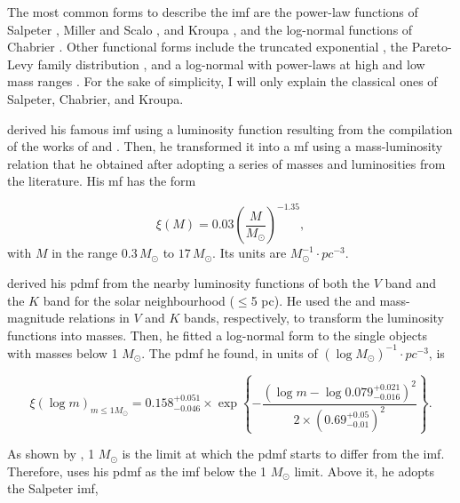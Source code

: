 The most common forms to describe the \gls{imf} are the power-law functions of Salpeter \citep{Salpeter1955}, Miller and Scalo \citep{1979ApJS...41..513M}, and Kroupa \citep{2001MNRAS.322..231K,2002Sci...295...82K,2013pss5.book..115K,Thies2007,2008MNRAS.390.1200T}, and the log-normal functions of Chabrier \citep{Chabrier2003a,Chabrier2003b,Chabrier2005}. Other functional forms include the truncated exponential \citep{2001AGM....18S0551D}, the Pareto-Levy family distribution \citep{2012MNRAS.423.1018C}, and a log-normal with power-laws at high and low mass ranges \citep{2013MNRAS.429.1725M}. For the sake of simplicity, I will only explain the classical ones of Salpeter, Chabrier, and Kroupa.

\citet{Salpeter1955} derived his famous \gls{imf} using a luminosity function resulting from the compilation of the works of \citet{1939POMin...7....1L,1941NYASA..42..201L} and \citet{1925PGro...38D...1V,1936PGro...47....1V}. Then, he transformed it into a \gls{mf} using a mass-luminosity relation that he obtained after adopting a series of masses and luminosities from the literature. His \gls{mf} has the form

\begin{equation}
\xi(M)=0.03 \left(\frac{M}{M_{\odot}}\right)^{-1.35},\nonumber
\end{equation}
with $M$ in the range $0.3\,M_{\odot}$ to  $17\,M_{\odot}$. Its units are $ M_{\odot}^{-1} \cdot pc^{-3}$.

\citet{Chabrier2003a,Chabrier2003b} derived his \gls{pdmf} from the nearby luminosity functions of both the $V$ band \citep{1986AJ.....91..621D} and the $K$ band \citep{1990ApJ...350..334H} for the solar neighbourhood ($\leq$5 pc). He used the \citet{2000A&A...364..217D} and \citet{1998A&A...337..403B} mass-magnitude relations in $V$ and $K$ bands, respectively, to transform the luminosity functions into masses. Then, he fitted a log-normal form to the single objects with masses below 1 $M_{\odot}$. The \gls{pdmf} he found, in units of $(\log M_{\odot})^{-1}\cdot pc^{-3}$, is 

\begin{equation}
\xi(\log m)_{m\leq1M_{\odot}}=0.158_{-0.046}^{+0.051} \times \exp{\left\{-\frac{(\log m - \log 0.079_{-0.016}^{+0.021})^2}{2 \times (0.69_{-0.01}^{+0.05})^2}\right\}}.\nonumber
\end{equation}

As shown by \citet{1986FCPh...11....1S}, 1 $M_{\odot}$ is the limit at which the \gls{pdmf} starts to differ from the \gls{imf}. Therefore, \citet{Chabrier2003b} uses his \gls{pdmf} as the \gls{imf} below the 1 $M_{\odot}$ limit. Above it, he adopts the Salpeter \gls{imf},

